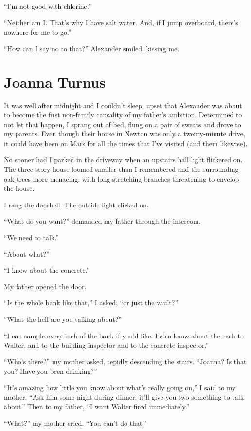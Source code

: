 ``I'm not good with chlorine.''

``Neither am I. That's why I have salt water. And, if I jump overboard,
there's nowhere for me to go.''

``How can I say no to that?'' Alexander smiled, kissing me.

\chapter{Joanna Turnus}

\titlemark

It was well after midnight and I couldn't sleep, upset that Alexander
was about to become the first non-family causality of my father's
ambition. Determined to not let that happen, I sprang out of bed, flung
on a pair of sweats and drove to my parents. Even though their house in
Newton was only a twenty-minute drive, it could have been on Mars for
all the times that I've visited (and them likewise).

No sooner had I parked in the driveway when an upstairs hall light
flickered on. The three-story house loomed smaller than I remembered and
the surrounding oak trees more menacing, with long-stretching branches
threatening to envelop the house.

I rang the doorbell. The outside light clicked on.

``What do you want?'' demanded my father through the intercom.

``We need to talk.''

``About what?''

``I know about the concrete.''

My father opened the door.

``Is the whole bank like that,'' I asked, ``or just the vault?''

``What the hell are you talking about?''

``I can sample every inch of the bank if you'd like. I also know about
the cash to Walter, and to the building inspector and to the concrete
inspector.''

``Who's there?'' my mother asked, tepidly descending the stairs.
``Joanna? Is that you? Have you been drinking?''

``It's amazing how little you know about what's really going on,'' I
said to my mother. ``Ask him some night during dinner; it'll give you
two something to talk about.'' Then to my father, ``I want Walter fired
immediately.''

``What?'' my mother cried. ``You can't do that.''

